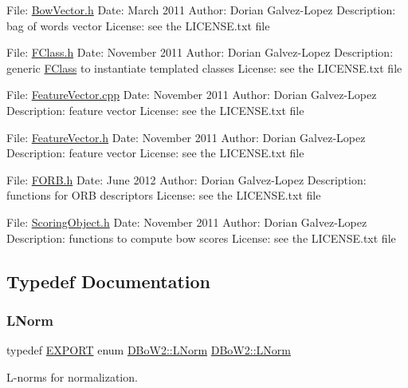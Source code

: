 File\+: \mbox{\hyperlink{_bow_vector_8h}{Bow\+Vector.\+h}} Date\+: March 2011 Author\+: Dorian Galvez-\/\+Lopez Description\+: bag of words vector License\+: see the L\+I\+C\+E\+N\+S\+E.\+txt file

File\+: \mbox{\hyperlink{_f_class_8h}{F\+Class.\+h}} Date\+: November 2011 Author\+: Dorian Galvez-\/\+Lopez Description\+: generic \mbox{\hyperlink{class_d_bo_w2_1_1_f_class}{F\+Class}} to instantiate templated classes License\+: see the L\+I\+C\+E\+N\+S\+E.\+txt file

File\+: \mbox{\hyperlink{_feature_vector_8cpp}{Feature\+Vector.\+cpp}} Date\+: November 2011 Author\+: Dorian Galvez-\/\+Lopez Description\+: feature vector License\+: see the L\+I\+C\+E\+N\+S\+E.\+txt file

File\+: \mbox{\hyperlink{_feature_vector_8h}{Feature\+Vector.\+h}} Date\+: November 2011 Author\+: Dorian Galvez-\/\+Lopez Description\+: feature vector License\+: see the L\+I\+C\+E\+N\+S\+E.\+txt file

File\+: \mbox{\hyperlink{_f_o_r_b_8h}{F\+O\+R\+B.\+h}} Date\+: June 2012 Author\+: Dorian Galvez-\/\+Lopez Description\+: functions for O\+RB descriptors License\+: see the L\+I\+C\+E\+N\+S\+E.\+txt file

File\+: \mbox{\hyperlink{_scoring_object_8h}{Scoring\+Object.\+h}} Date\+: November 2011 Author\+: Dorian Galvez-\/\+Lopez Description\+: functions to compute bow scores License\+: see the L\+I\+C\+E\+N\+S\+E.\+txt file 

\subsection{Typedef Documentation}
\mbox{\label{namespace_d_bo_w2_a350a8bb9e38231cbf68ef07399d7a0c8}} 
\subsubsection{\texorpdfstring{L\+Norm}{LNorm}}
{\footnotesize\ttfamily typedef \mbox{\hyperlink{_d_bo_w2_2_d_utils_2config_8h_a3472d8cdbb788d5f1815b3522595bc49}{E\+X\+P\+O\+RT}} enum \mbox{\hyperlink{namespace_d_bo_w2_a53e9e0bcfc25c861815e413a7cf3fa51}{D\+Bo\+W2\+::\+L\+Norm}}  \mbox{\hyperlink{namespace_d_bo_w2_a53e9e0bcfc25c861815e413a7cf3fa51}{D\+Bo\+W2\+::\+L\+Norm}}}



L-\/norms for normalization. 

